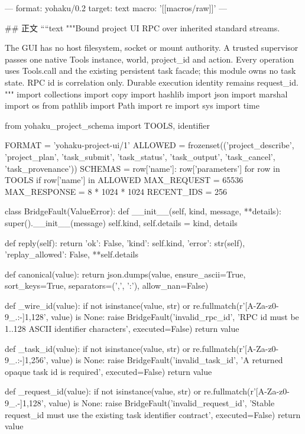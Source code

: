---
format: yohaku/0.2
target: text
macro: '[[macros/raw]]'
---

## 正文
````text
"""Bound project UI RPC over inherited standard streams.

The GUI has no host filesystem, socket or mount authority. A trusted supervisor
passes one native Tools instance, world, project_id and action. Every operation
uses Tools.call and the existing persistent task facade; this module owns no task
state. RPC id is correlation only. Durable execution identity remains request_id.
"""
import collections
import copy
import hashlib
import json
import marshal
import os
from pathlib import Path
import re
import sys
import time

from yohaku_project_schema import TOOLS, identifier

FORMAT = 'yohaku-project-ui/1'
ALLOWED = frozenset(('project_describe', 'project_plan', 'task_submit', 'task_status',
                     'task_output', 'task_cancel', 'task_provenance'))
SCHEMAS = {row['name']: row['parameters'] for row in TOOLS if row['name'] in ALLOWED}
MAX_REQUEST = 65536
MAX_RESPONSE = 8 * 1024 * 1024
RECENT_IDS = 256


class BridgeFault(ValueError):
    def __init__(self, kind, message, **details):
        super().__init__(message)
        self.kind, self.details = kind, details

    def reply(self):
        return {'ok': False, 'kind': self.kind, 'error': str(self),
                'replay_allowed': False, **self.details}


def canonical(value):
    return json.dumps(value, ensure_ascii=True, sort_keys=True,
                      separators=(',', ':'), allow_nan=False)


def _wire_id(value):
    if not isinstance(value, str) or re.fullmatch(r'[A-Za-z0-9_.:-]{1,128}', value) is None:
        raise BridgeFault('invalid_rpc_id', 'RPC id must be 1..128 ASCII identifier characters', executed=False)
    return value


def _task_id(value):
    if not isinstance(value, str) or re.fullmatch(r'[A-Za-z0-9_.:-]{1,256}', value) is None:
        raise BridgeFault('invalid_task_id', 'A returned opaque task id is required', executed=False)
    return value


def _request_id(value):
    if not isinstance(value, str) or re.fullmatch(r'[A-Za-z0-9_.-]{1,128}', value) is None:
        raise BridgeFault('invalid_request_id', 'Stable request_id must use the existing task identifier contract', executed=False)
    return value


